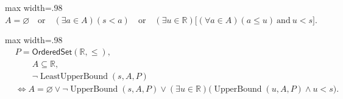 \begin{remark*}
\begin{center}\begin{adjustbox}{max width=.98\linewidth}$\displaystyle A=\varnothing \quad\text{or}\quad (\exists a\in A)(s<a) \quad\text{or}\quad (\exists u\in\mathbb{R})\bigl[(\forall a\in A)(a\leq u)\ \text{and}\ u<s\bigr].$\end{adjustbox}\end{center}
\end{remark*}

\begin{remark*}
\begin{center}\begin{adjustbox}{max width=.98\linewidth}$\displaystyle \begin{aligned}&P=\mathsf{OrderedSet}(\mathbb{R},\leq),\\ &\qquad A\subseteq\mathbb{R},\\ &\qquad \neg\operatorname{LeastUpperBound}(s,A,P) \\ &\Longleftrightarrow A=\varnothing \lor \neg\operatorname{UpperBound}(s,A,P) \lor (\exists u\in\mathbb{R}) \bigl(\operatorname{UpperBound}(u,A,P)\land u<s\bigr).\end{aligned}$\end{adjustbox}\end{center}
\end{remark*}
